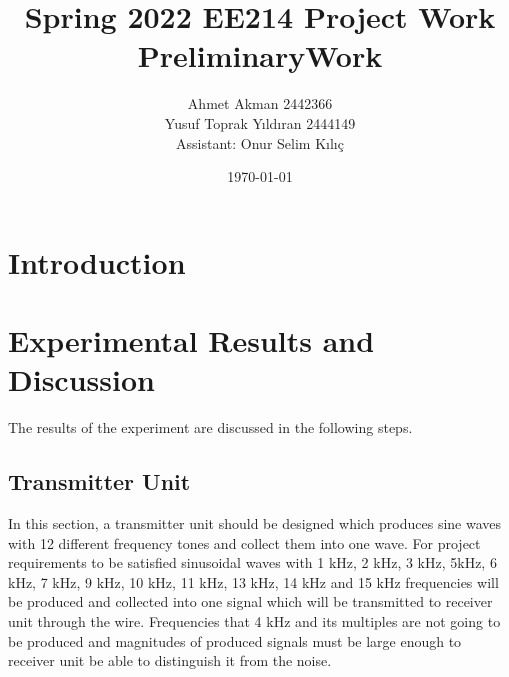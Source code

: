 \documentclass[letterpaper,12pt]{article}
\begin{document}
\thispagestyle{empty}

\title{Spring 2022 EE214 Project Work  \protect\\ PreliminaryWork }
\author{Ahmet Akman 2442366 \protect\\ Yusuf Toprak Yıldıran 2444149 \protect\\ Assistant: Onur Selim Kılıç}
\date{\today}
\maketitle
\tableofcontents
\section{Introduction}
\section{Experimental Results and Discussion}
The results of the experiment are discussed in the following steps.
%
\subsection{Transmitter Unit}
In this section, a transmitter unit should be designed which produces sine waves with 12 different frequency tones and collect them into one wave. For project requirements to be satisfied sinusoidal waves with 1 kHz, 2 kHz, 3 kHz, 5kHz, 6 kHz, 7 kHz, 9 kHz, 10 kHz, 11 kHz, 13 kHz, 14 kHz and 15 kHz frequencies will be produced and collected into one signal which will be transmitted to receiver unit through the wire. Frequencies that 4 kHz and its multiples are not going to be produced and magnitudes of produced signals must be large enough to receiver unit be able to distinguish it from the noise.
\end{document}
